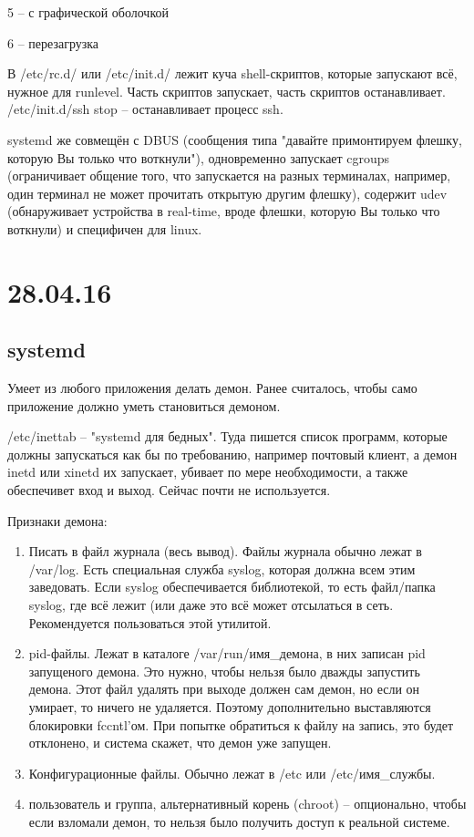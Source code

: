 \documentclass[a4paper,10pt]{article}
\begin{document}
\begin{enumerate}
5 -- с графической оболочкой

6 -- перезагрузка

В /etc/rc.d/ или /etc/init.d/ лежит куча shell-скриптов, которые запускают всё, нужное для runlevel. Часть скриптов запускает, часть скриптов останавливает.
/etc/init.d/ssh stop -- останавливает процесс ssh.

systemd же совмещён с DBUS (сообщения типа "давайте примонтируем флешку, которую Вы только что воткнули"), одновременно запускает cgroups (ограничивает общение того, что запускается на разных терминалах, например, один терминал не может прочитать открытую другим флешку), содержит udev (обнаруживает устройства в real-time, вроде флешки, которую Вы только что воткнули) и специфичен для linux.


\end{enumerate}


\section{28.04.16}
\subsection{systemd}
Умеет из любого приложения делать демон.
Ранее считалось, чтобы само приложение должно уметь становиться демоном.

/etc/inettab -- "systemd для бедных". Туда пишется список программ, которые должны запускаться как бы по требованию, например почтовый клиент, а демон inetd или xinetd их запускает, убивает по мере необходимости, а также обеспечивет вход и выход. Сейчас почти не используется.

Признаки демона:
\begin{enumerate}
 \item Писать в файл журнала (весь вывод). Файлы журнала обычно лежат в /var/log.
 Есть специальная служба syslog, которая должна всем этим заведовать. Если syslog обеспечивается библиотекой, то есть файл/папка syslog, где всё лежит (или даже это всё может отсылаться в сеть. Рекомендуется пользоваться этой утилитой.
 \item pid-файлы. Лежат в каталоге /var/run/имя\_демона, в них записан pid запущеного демона. Это нужно, чтобы нельзя было дважды запустить демона. Этот файл удалять при выходе должен сам демон, но если он умирает, то ничего не удаляется. Поэтому дополнительно выставляются блокировки fccntl'ом. При попытке обратиться к файлу на запись, это будет отклонено, и система скажет, что демон уже запущен.
 \item Конфигурационные файлы. Обычно лежат в /etc или /etc/имя\_службы.
 \item пользователь и группа, альтернативный корень (chroot) -- опционально, чтобы если взломали демон, то нельзя было получить доступ к реальной системе.
\end{enumerate}
\end{document}
